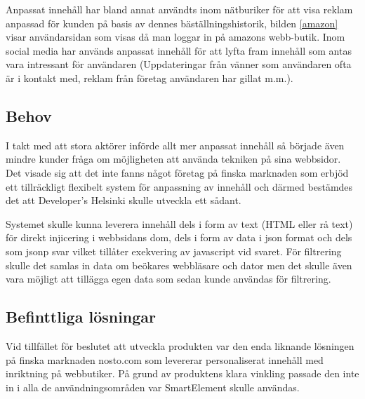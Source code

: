 Anpassat innehåll har bland annat användts inom nätburiker för att visa reklam anpassad för kunden på basis av dennes bäställningshistorik, bilden \ref{amazon} visar användarsidan som visas då man loggar in på amazons webb-butik. Inom social media har används anpassat innehåll för att lyfta fram innehåll som antas vara intressant för användaren (Uppdateringar från vänner som användaren ofta är i kontakt med, reklam från företag användaren har gillat m.m.). \citep{socialmedia}


\subsection{Behov}

I takt med att stora aktörer införde allt mer anpassat innehåll så började även mindre kunder fråga om möjligheten att använda tekniken på sina webbsidor. Det visade sig att det inte fanns något företag på finska marknaden som erbjöd ett tillräckligt flexibelt system för anpassning av innehåll och därmed bestämdes det att Developer's Helsinki skulle utveckla ett sådant.

Systemet skulle kunna leverera innehåll dels i form av text (HTML eller rå text) för direkt injicering i webbsidans \gls{dom}, dels i form av data i \gls{json} format och dels som \gls{jsonp} svar vilket tillåter exekvering av javascript vid svaret. För filtrering skulle det samlas in data om beökares webbläsare och dator men det skulle även vara möjligt att tillägga egen data som sedan kunde användas för filtrering.

\subsection{Befinttliga lösningar}

Vid tillfället för beslutet att utveckla produkten var den enda liknande lösningen på finska marknaden nosto.com som levererar personaliserat innehåll med inriktning på webbutiker.\citep{nosto} På grund av produktens klara vinkling passade den inte in i alla de användningsområden var SmartElement skulle användas.


